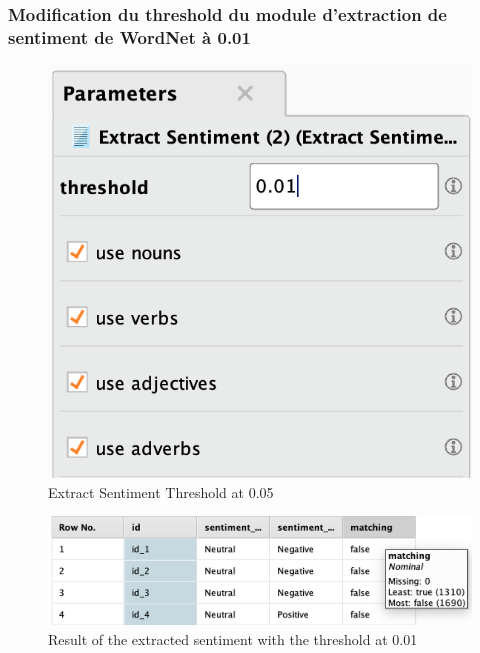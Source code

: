 \documentclass[a4paper]{article}
\begin{document}
\subsubsection{Modification du threshold du module d'extraction de sentiment de WordNet à 0.01}
\begin{figure}[H]
\begin{center}
	\includegraphics[width=\linewidth/3]{imgs/part_3/3_processing_documents_full_0_01}
	\caption{Extract Sentiment Threshold at 0.05}
	\label{fig:3_processing_documents_full_0_01}
\end{center}
\end{figure}
\begin{figure}[H]
	\includegraphics[width=\linewidth]{imgs/part_3/3_processing_documents_full_0_01_results}
	\caption{Result of the extracted sentiment with the threshold at 0.01}
	\label{fig:3_processing_documents_full_0_01_results}
\end{figure}
\end{document}
